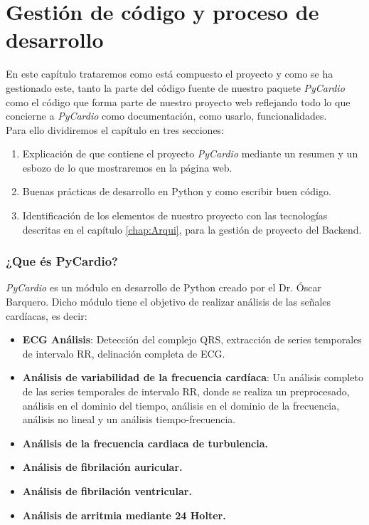 \chapter{Gestión de código y proceso de desarrollo}
\label{chap:codeManagement}
\begin{comment}
Introducción de lo que es el proyecto, lo del libro de Python y luego las tecnologías usadas en el proyecto unidas con la introducción.
\end{comment}
En este capítulo trataremos como está compuesto el proyecto y como se ha gestionado este, tanto la parte del código fuente de nuestro paquete \emph{PyCardio} como el código que forma parte de nuestro proyecto web reflejando todo lo que concierne a \emph{PyCardio} como documentación, como usarlo, funcionalidades. \\
Para ello dividiremos el capítulo en tres secciones:
\begin{enumerate}
    \item Explicación de que contiene el proyecto \emph{PyCardio} mediante un resumen y un esbozo de lo que mostraremos en la página web.
    \item Buenas prácticas de desarrollo en Python y como escribir buen código.
    \item Identificación de los elementos de nuestro proyecto con las tecnologías descritas en el capítulo \ref{chap:Arqui}, para la gestión de proyecto del Backend.
\end{enumerate}

\subsection{¿Que és PyCardio?}
\label{subsec:explainPyCardio}
\emph{PyCardio} es un módulo en desarrollo  de Python creado por el Dr. Óscar Barquero. Dicho módulo tiene el objetivo de realizar análisis de las señales cardíacas, es decir:
\begin{itemize}
    \item \textbf{ECG Análisis}: Detección del complejo QRS, extracción de series temporales de intervalo RR, delinación completa de ECG.
    \item \textbf{Análisis de variabilidad de la frecuencia cardíaca}: Un análisis completo de las series temporales de intervalo RR, donde se realiza un preprocesado, análisis en  el dominio del tiempo, análisis en el dominio de la frecuencia, análisis no lineal y un análisis tiempo-frecuencia.
    \item \textbf{Análisis de la frecuencia cardiaca de turbulencia.}
    \item \textbf{Análisis de fibrilación auricular.}
    \item \textbf{Análisis de fibrilación ventricular.}
    \item \textbf{Análisis de arritmia mediante 24 Holter.}
\end{itemize}

